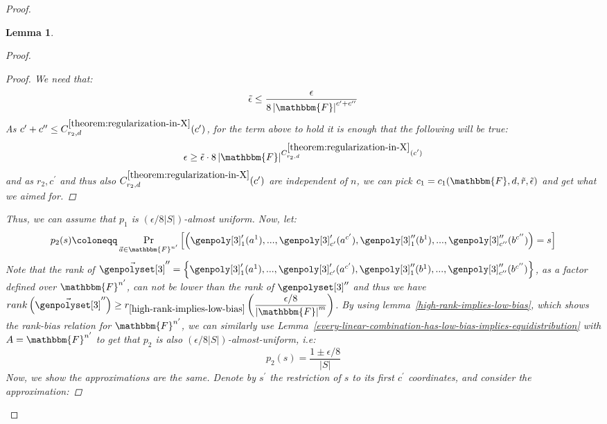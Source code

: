\documentclass[10pt,a4paper]{article}
\newtheorem{lemma}[theorem]{Lemma}
\newcommand{\definedas}[0]{\coloneqq}
\newcommand{\parens}[1]{\left( #1 \right)}
\newcommand{\set}[1]{\left\{ #1 \right\}}
\newcommand{\basefield}[0]{\mathbbm{F}}
\newcommand{\blocklength}[0]{n}
\newcommand{\degree}[0]{d}
\newcommand{\rank}[1]{rank \parens{#1}}
\newcommand{\rankval}[0]{{{r}}}
\newcommand{\rankfunc}[0]{{{{r}}}}
\newcommand{\rankbiasfunc}[0]{{\tilde{r}}}
\newcommand{\epsilonlimitedrankbias}[0]{{\tilde{\epsilon}}}
\newcommand{\abs}[1]{\left| #1 \right|}
\newcommand{\prex}[2]{\Pr_{#1}\left[ #2 \right]}
\begin{document}
\begin{proof}
\begin{lemma}
\begin{proof}
\begin{proof}
                We need that:
                \[
                    \epsilonlimitedrankbias \leq \dfrac{\epsilon}{8 \abs{\basefield}^{c^\prime + c^{\prime\prime}}}
                \]
                As $c^\prime + c^{\prime\prime} \leq C^{\ref{theorem:regularization-in-X}}_{\rankfunc_2, \degree}(c^\prime)$,
                for the term above to hold it is enough that the following will be true:
                \[
                    \epsilon \geq \epsilonlimitedrankbias \cdot 8 \abs{\basefield}^{C^{\ref{theorem:regularization-in-X}}_{\rankfunc_2, \degree}(c^\prime)}
                \]
                and as $\rankfunc_2, c^\prime$ and thus also $C^{\ref{theorem:regularization-in-X}}_{\rankfunc_2, \degree}(c^\prime)$ are independent of $\blocklength$,
                we can pick $c_1 = c_1(\basefield, \degree, \rankbiasfunc, \epsilonlimitedrankbias)$ and get what we aimed for.
            \end{proof}
            Thus, we can assume that $p_1$ is $(\epsilon/8\abs{S})$-almost uniform.
            Now, let:
            \[
                p_2(s) \definedas \prex{\vec{a} \in \basefield^{\blocklength^\prime}}
                {\parens{\genpoly[3]^\prime_1(a^1),...,\genpoly[3]^\prime_{c^\prime}(a^{c^\prime}), \genpoly[3]^{\prime\prime}_1(b^{1}),...,\genpoly[3]^{\prime\prime}_{c^{\prime\prime}}(b^{c^{\prime\prime}})} = s}
            \]
            Note that the rank of $\vec{\genpolyset[3]}^{\prime\prime} = {\set{\genpoly[3]^\prime_1(a^1),...,\genpoly[3]^\prime_{c^\prime}(a^{c^\prime}), \genpoly[3]^{\prime\prime}_1(b^{1}),...,\genpoly[3]^{\prime\prime}_{c^{\prime\prime}}(b^{c^{\prime\prime}})}}$,
            as a factor defined over $\basefield^{\blocklength^\prime}$, can not be lower than the rank of $\genpolyset[3]^{\prime\prime}$
            and thus we have $\rank{\vec{\genpolyset[3]}^{\prime\prime}} \geq \rankval_{\ref{high-rank-implies-low-bias}}\parens{\dfrac{\epsilon / 8}{\abs{\basefield}^m}}$.
            By using lemma~{\ref{high-rank-implies-low-bias}}, which shows the rank-bias relation for $\basefield^{\blocklength^\prime}$,
            we can similarly use Lemma~\ref{every-linear-combination-has-low-bias-implies-equidistribution} with $A = \basefield^{\blocklength^\prime}$
            to get that $p_2$ is also $(\epsilon/8\abs{S})$-almost-uniform, i.e:
            \[
                p_2(s) = \dfrac{1 \pm \epsilon / 8}{\abs{S}}
            \]
            Now, we show the approximations are the same.
            Denote by $s^\prime$ the restriction of $s$ to its first $c^\prime$ coordinates, and consider the approximation:

\end{proof}
\end{lemma}
\end{proof}
\end{document}
